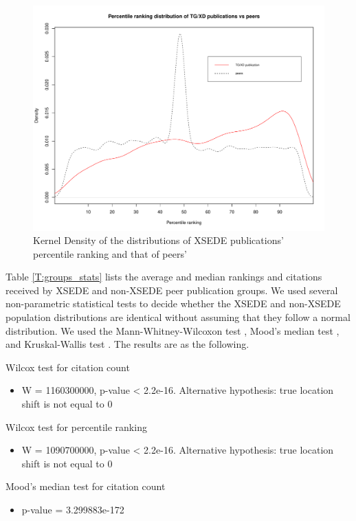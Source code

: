 \documentclass{sig-alternate}
\begin{document}
\begin{figure}[htb!]
    \includegraphics[width=0.95\columnwidth]{images/ptranking_distribution.pdf}
    \caption{Kernel Density of the distributions
of XSEDE publications' percentile ranking and that of peers'}
    \label{F:xd_peers_density}
\end{figure}

Table \ref{T:groups_stats} lists the average and median rankings and citations
received by XSEDE and non-XSEDE peer publication groups.
We used several non-parametric statistical tests to decide whether the XSEDE and non-XSEDE population distributions
are identical without assuming that they follow a normal distribution.
We used the Mann-Whitney-Wilcoxon test \cite{mann1947test}, Mood's median test \cite{brown1951median},
and Kruskal-Wallis test \cite{kruskal1952use}. The results are as the following.

Wilcox test for citation count
\begin{itemize}
\item W = 1160300000, p-value < 2.2e-16. Alternative hypothesis: true location shift is not equal to 0
\end{itemize}

Wilcox test for percentile ranking
\begin{itemize}
\item W = 1090700000, p-value < 2.2e-16. Alternative hypothesis: true location shift is not equal to 0
\end{itemize}

Mood's median test for citation count
\begin{itemize}
\item p-value = 3.299883e-172
\end{itemize}
\end{document}
